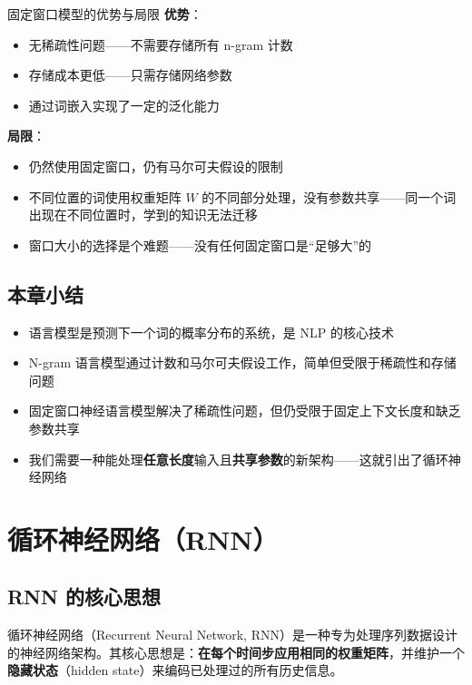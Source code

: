 \documentclass[a4paper]{article}
\begin{document}
\begin{importantbox}{固定窗口模型的优势与局限}
\textbf{优势}：
\begin{itemize}
    \item 无稀疏性问题——不需要存储所有 n-gram 计数
    \item 存储成本更低——只需存储网络参数
    \item 通过词嵌入实现了一定的泛化能力
\end{itemize}
\textbf{局限}：
\begin{itemize}
    \item 仍然使用固定窗口，仍有马尔可夫假设的限制
    \item 不同位置的词使用权重矩阵 $W$ 的不同部分处理，没有参数共享——同一个词出现在不同位置时，学到的知识无法迁移
    \item 窗口大小的选择是个难题——没有任何固定窗口是``足够大''的
\end{itemize}
\end{importantbox}

\subsection{本章小结}

\begin{itemize}
    \item 语言模型是预测下一个词的概率分布的系统，是 NLP 的核心技术
    \item N-gram 语言模型通过计数和马尔可夫假设工作，简单但受限于稀疏性和存储问题
    \item 固定窗口神经语言模型解决了稀疏性问题，但仍受限于固定上下文长度和缺乏参数共享
    \item 我们需要一种能处理\textbf{任意长度}输入且\textbf{共享参数}的新架构——这就引出了循环神经网络
\end{itemize}


\section{循环神经网络（RNN）}

\subsection{RNN 的核心思想}

循环神经网络（Recurrent Neural Network, RNN）是一种专为处理序列数据设计的神经网络架构。其核心思想是：\textbf{在每个时间步应用相同的权重矩阵}，并维护一个\textbf{隐藏状态}（hidden state）来编码已处理过的所有历史信息。
\end{document}
